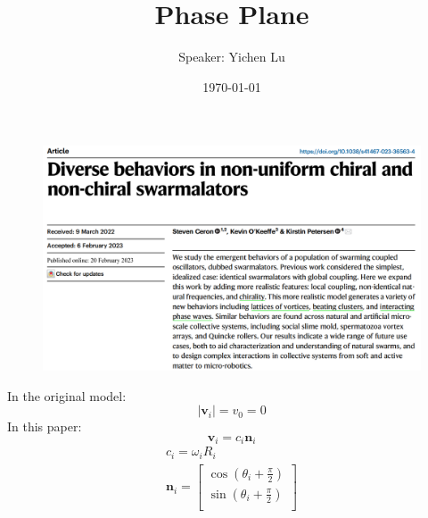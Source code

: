 \documentclass[10pt,aspectratio=43,mathserif,table]{beamer}
\title{Phase Plane}
\author{Speaker: Yichen Lu\quad \newline  \newline \quad }
\institute{\fontsize{8pt}{14pt}}
\date{\today}
\begin{document}
\frame{\titlepage}

\begin{frame}
    \begin{figure}
        \centering
        \includegraphics[width=\textwidth]{title.jpg}
    \end{figure}
\end{frame}

\begin{frame}
    In the original model:
        $$|\mathbf{v}_i|=v_0=0$$
    In this paper:
        $$
        \mathbf{v}_i=c_i \mathbf{n}_i
        $$
        $$
        \begin{array}{c}
            c_i=\omega _iR_i\\
            \mathbf{n}_i=\left[ \begin{array}{c}
            \cos \left( \theta _i+\frac{\pi}{2} \right)\\
            \sin \left( \theta _i+\frac{\pi}{2} \right)\\
        \end{array} \right]\\
        \end{array}
        $$

\end{frame}
\end{document}
